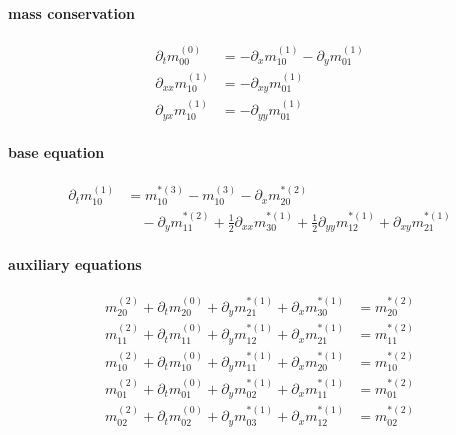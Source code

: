 \documentclass{article}
\begin{document}
  \paragraph{mass conservation}
  \begin{align}
    \partial_t m_{00}^{(0)}  & =  - \partial_x m_{10}^{(1)} - \partial_y m_{01}^{(1)}\tag{M1} \\
    \partial_{xx} m_{10}^{(1)}  & = - \partial_{xy} m_{01}^{(1)} \tag{M2}\\
    \partial_{yx} m_{10}^{(1)}  & = - \partial_{yy} m_{01}^{(1)} \tag{M3}
  \end{align}

  \paragraph{base equation}
  \begin{equation}
    \tag{B1}
    \begin{aligned}
       \partial_t m_{10}^{(1)} & =
      m_{10}^{*(3)} - m_{10}^{(3)} - \partial_x m_{20}^{*(2)} \\
      &\quad - \partial_y m_{11}^{*(2)} + \frac{1}{2}\partial_{xx} m_{30}^{*(1)} + \frac{1}{2} \partial_{yy} m_{12}^{*(1)} + \partial_{xy} m_{21}^{*(1)}
    \end{aligned}
  \end{equation}

  \paragraph{auxiliary equations}
  \begin{align}
    m_{20}^{(2)} + \partial_t m_{20}^{(0)} + \partial_y m_{21}^{*(1)} + \partial_x m_{30}^{*(1)} &= m_{20}^{*(2)} \tag{A1} \\
    m_{11}^{(2)} + \partial_t m_{11}^{(0)} + \partial_y m_{12}^{*(1)} + \partial_x m_{21}^{*(1)} &= m_{11}^{*(2)} \tag{A2} \\
    m_{10}^{(2)} + \partial_t m_{10}^{(0)} + \partial_y m_{11}^{*(1)} + \partial_x m_{20}^{*(1)} &= m_{10}^{*(2)} \tag{A3} \\
    m_{01}^{(2)} + \partial_t m_{01}^{(0)} + \partial_y m_{02}^{*(1)} + \partial_x m_{11}^{*(1)} &= m_{01}^{*(2)} \tag{A4} \\
    m_{02}^{(2)} + \partial_t m_{02}^{(0)} + \partial_y m_{03}^{*(1)} + \partial_x m_{12}^{*(1)} &= m_{02}^{*(2)} \tag{A5}
  \end{align}
\end{document}
